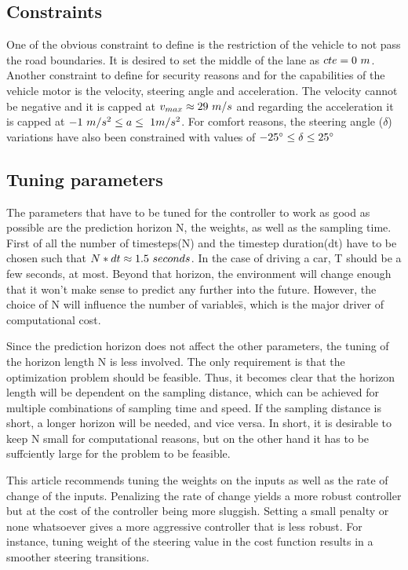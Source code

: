 \subsection{Constraints}

One of the obvious constraint to define is the restriction of the vehicle to not pass the road boundaries. It is desired to set the middle of the lane as $cte = 0 ~\small{m}$. Another constraint to define for security reasons and for the capabilities of the vehicle motor is the velocity, steering angle and acceleration. The velocity cannot be negative and it is capped at $v_{max} \approx 29 ~\small{m / s}$ and regarding the acceleration it is capped at $-1~\small{m/s^2} \leq a  \leq ~\small{1m/s^2}$. For comfort reasons, the steering angle  ($\delta$) variations have also been constrained with values of $-25\degree \leq  \delta \leq 25\degree$


\subsection{Tuning parameters}


The parameters that have to be tuned for the controller to work as good as possible are the prediction horizon N, the weights, as well as the sampling time. First of all the number of timesteps(N) and the timestep duration(dt) have to be chosen such that $N*dt \approx 1.5~\small{seconds}$. In the case of driving a car, T should be a few seconds, at most. Beyond that horizon, the environment will change enough that it won't make sense to predict any further into the future. However, the choice of N will influence the number of variables̄, which is the major driver of computational cost.

Since the prediction horizon does not affect the other parameters, the tuning of the horizon length N is less involved. The only requirement is that the optimization problem should be feasible. Thus, it becomes clear that the horizon length will be dependent on the sampling distance, which can be achieved for multiple combinations of sampling time and speed. If the sampling distance is short, a longer horizon will be needed, and vice versa. In short, it is desirable to keep N small for computational reasons, but on the other hand it has to be suffciently large for the problem to be feasible.

This article recommends tuning the weights on the inputs as well as the rate of change of the inputs. Penalizing the rate of change yields a more robust controller but at the cost of the controller being more sluggish. Setting a small penalty or none whatsoever gives a more aggressive controller that is less robust. For instance, tuning weight of the steering value in the cost function results in a smoother steering transitions.

